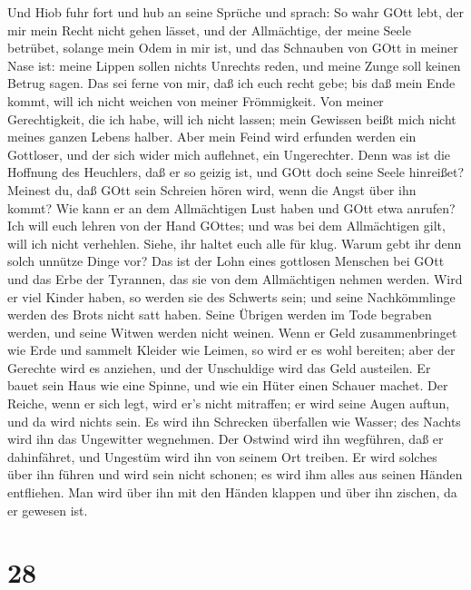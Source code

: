  Und Hiob fuhr fort und hub an seine Sprüche und sprach:
 So wahr GOtt lebt, der mir mein Recht nicht gehen lässet,
und der Allmächtige, der meine Seele betrübet,  solange mein
Odem in mir ist, und das Schnauben von GOtt in meiner Nase ist:
 meine Lippen sollen nichts Unrechts reden, und meine Zunge
soll keinen Betrug sagen.  Das sei ferne von mir, daß ich
euch recht gebe; bis daß mein Ende kommt, will ich nicht weichen von
meiner Frömmigkeit.  Von meiner Gerechtigkeit, die ich habe,
will ich nicht lassen; mein Gewissen beißt mich nicht meines ganzen
Lebens halber.  Aber mein Feind wird erfunden werden ein
Gottloser, und der sich wider mich auflehnet, ein Ungerechter.
 Denn was ist die Hoffnung des Heuchlers, daß er so geizig
ist, und GOtt doch seine Seele hinreißet?  Meinest du, daß
GOtt sein Schreien hören wird, wenn die Angst über ihn kommt?
 Wie kann er an dem Allmächtigen Lust haben und GOtt etwa
anrufen?  Ich will euch lehren von der Hand GOttes; und was
bei dem Allmächtigen gilt, will ich nicht verhehlen. 
Siehe, ihr haltet euch alle für klug. Warum gebt ihr denn solch unnütze
Dinge vor?  Das ist der Lohn eines gottlosen Menschen bei
GOtt und das Erbe der Tyrannen, das sie von dem Allmächtigen nehmen
werden.  Wird er viel Kinder haben, so werden sie des
Schwerts sein; und seine Nachkömmlinge werden des Brots nicht satt
haben.  Seine Übrigen werden im Tode begraben werden, und
seine Witwen werden nicht weinen.  Wenn er Geld
zusammenbringet wie Erde und sammelt Kleider wie Leimen, 
so wird er es wohl bereiten; aber der Gerechte wird es anziehen, und der
Unschuldige wird das Geld austeilen.  Er bauet sein Haus
wie eine Spinne, und wie ein Hüter einen Schauer machet. 
Der Reiche, wenn er sich legt, wird er's nicht mitraffen; er wird seine
Augen auftun, und da wird nichts sein.  Es wird ihn
Schrecken überfallen wie Wasser; des Nachts wird ihn das Ungewitter
wegnehmen.  Der Ostwind wird ihn wegführen, daß er
dahinfähret, und Ungestüm wird ihn von seinem Ort treiben. 
Er wird solches über ihn führen und wird sein nicht schonen; es wird ihm
alles aus seinen Händen entfliehen.  Man wird über ihn mit
den Händen klappen und über ihn zischen, da er gewesen ist.

\hypertarget{section-27}{%
\section{28}\label{section-27}}

